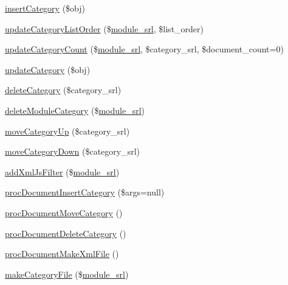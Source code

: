 \begin{DoxyCompactItemize}
\item 
\hyperlink{classdocumentController_a5809b6e744e354b7979788f8a4d2d825}{insert\-Category} (\$obj)
\item 
\hyperlink{classdocumentController_a6f3fe3265fd98035ffdd849a03dbe45c}{update\-Category\-List\-Order} (\$\hyperlink{ko_8install_8php_a370bb6450fab1da3e0ed9f484a38b761}{module\-\_\-srl}, \$list\-\_\-order)
\item 
\hyperlink{classdocumentController_a6c2c3cad331e43a7fff774142fe62d00}{update\-Category\-Count} (\$\hyperlink{ko_8install_8php_a370bb6450fab1da3e0ed9f484a38b761}{module\-\_\-srl}, \$category\-\_\-srl, \$document\-\_\-count=0)
\item 
\hyperlink{classdocumentController_a7a4e53cda0765a416280e403b6193b0a}{update\-Category} (\$obj)
\item 
\hyperlink{classdocumentController_ad5840bc0f6ed0040779c5d90d8c327a6}{delete\-Category} (\$category\-\_\-srl)
\item 
\hyperlink{classdocumentController_a8a357bcedee02e8fda122ed24f2a9c1c}{delete\-Module\-Category} (\$\hyperlink{ko_8install_8php_a370bb6450fab1da3e0ed9f484a38b761}{module\-\_\-srl})
\item 
\hyperlink{classdocumentController_a16a00fabad8b270e40d7fa196350280c}{move\-Category\-Up} (\$category\-\_\-srl)
\item 
\hyperlink{classdocumentController_ab6befd47268a1fbfcc56dda3c3a71dc4}{move\-Category\-Down} (\$category\-\_\-srl)
\item 
\hyperlink{classdocumentController_a1fe6155cfd253e19d0583cc74a2cab35}{add\-Xml\-Js\-Filter} (\$\hyperlink{ko_8install_8php_a370bb6450fab1da3e0ed9f484a38b761}{module\-\_\-srl})
\item 
\hyperlink{classdocumentController_aad9894e1432083a62a883568c7b3a42b}{proc\-Document\-Insert\-Category} (\$args=null)
\item 
\hyperlink{classdocumentController_a6bb8b84c1f775b59f74ef8d68ba48f55}{proc\-Document\-Move\-Category} ()
\item 
\hyperlink{classdocumentController_a60d6012f96c71ee539d4152bc2c6f994}{proc\-Document\-Delete\-Category} ()
\item 
\hyperlink{classdocumentController_a749d60be23e4645a5656a82a4fae1962}{proc\-Document\-Make\-Xml\-File} ()
\item 
\hyperlink{classdocumentController_a75dc24adc286b03e6eeb23eb7f771d8f}{make\-Category\-File} (\$\hyperlink{ko_8install_8php_a370bb6450fab1da3e0ed9f484a38b761}{module\-\_\-srl})
\item 

\end{DoxyCompactItemize}
